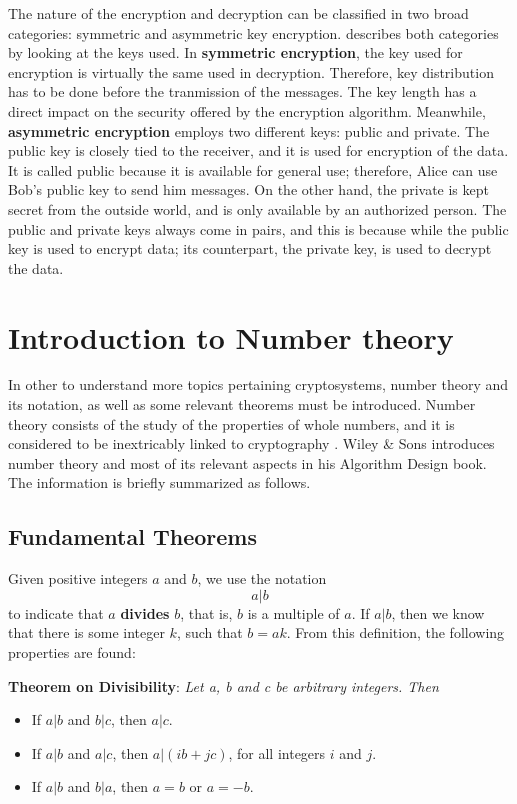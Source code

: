 The nature of the encryption and decryption can be classified in two broad categories: symmetric and asymmetric key encryption. \cite{CryptoKeys} describes both categories by looking at the keys used. In \textbf{symmetric encryption}, the key used for encryption is virtually the same used in decryption. Therefore, key distribution has to be done before the tranmission of the messages. The key length has a direct impact on the security offered by the encryption algorithm. Meanwhile, \textbf{asymmetric encryption} employs two different keys: public and private. The public key is closely tied to the receiver, and it is used for encryption of the data. It is called public because it is available for general use; therefore, Alice can use Bob's public key to send him messages. On the other hand, the private is kept secret from the outside world, and is only available by an authorized person. The public and private keys always come in pairs, and this is because while the public key is used to encrypt data; its counterpart, the private key, is used to decrypt the data. 

\section{Introduction to Number theory}

In other to understand more topics pertaining cryptosystems, number theory and its notation, as well as some relevant theorems must be introduced. Number theory consists of the study of the properties of whole numbers, and it is considered to be inextricably linked to cryptography \cite{stark1970introduction}. Wiley \& Sons \cite{2008algorithm} introduces number theory and most of its relevant aspects in his Algorithm Design book. The information is briefly summarized as follows.

\subsection{Fundamental Theorems}

Given positive integers $a$ and $b$, we use the notation 
\begin{equation}
a|b
\end{equation}
to indicate that $a$ \textbf{divides} $b$, that is, $b$ is a multiple of $a$. If $a|b$, then we know that there is some integer $k$, such that $b=ak$. From this definition, the following properties are found:

\textbf{Theorem on Divisibility}: \textit{Let a, b and c be arbitrary integers. Then}
\begin{itemize}
\item If $a|b$ and $b|c$, then $a|c$.
\item If $a|b$ and $a|c$, then $a|(ib+jc)$, for all integers $i$ and $j$.
\item If $a|b$ and $b|a$, then $a=b$ or $a= -b$.
\end{itemize}

